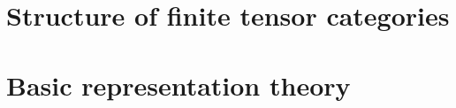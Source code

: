         
    
    \begin{appendices}
        \chapter{Structure of finite tensor categories}
            \begin{abstract}
            
            \end{abstract}
            
            \minitoc
        
            
            
            
            
        \chapter{Basic representation theory}
            \begin{abstract}
            
            \end{abstract}
            
            \minitoc
            
            
            
            
        
    \end{appendices}
	
	\printbibliography

